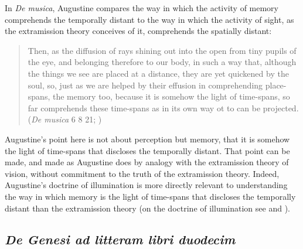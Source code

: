 \documentclass[12pt]{article}
\begin{document}
In \emph{De musica}, Augustine compares the way in which the activity of memory comprehends the temporally distant to the way in which the activity of sight, as the extramission theory conceives of it, comprehends the spatially distant:
\begin{quote}
	Then, as the diffusion of rays shining out into the open from tiny pupils of the eye, and belonging therefore to our body, in such a way that, although the things we see are placed at a distance, they are yet quickened by the soul, so, just as we are helped by their effusion in comprehending place-spans, the memory too, because it is somehow the light of time-spans, so far comprehends these time-spans as in its own way ot to can be projected. (\emph{De musica} 6 8 21; \citealt[346]{Taliaferro:1947aa})
\end{quote}
Augustine's point here is not about perception but memory, that it is somehow the light of time-spans that discloses the temporally distant. That point can be made, and made as Augustine does by analogy with the extramission theory of vision, without commitment to the truth of the extramission theory. Indeed, Augustine's doctrine of illumination is more directly relevant to understanding the way in which memory is the light of time-spans that discloses the temporally distant than the extramission theory (on the doctrine of illumination see \citealt{Allers:1952os} and \citealt{Matthews:2014aa}).


\subsection{\emph{De Genesi ad litteram libri duodecim}} %
\label{sub:de_genesi_ad_litteram_libri_duodecim}
\end{document}
